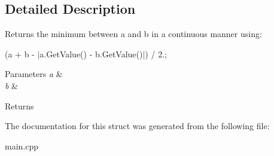 \subsection{Detailed Description}
Returns the minimum between a and b in a continuous manner using\+:

(a + b -\/ $\vert$a.Get\+Value() -\/ b.\+Get\+Value()$\vert$) / 2.;


\begin{DoxyParams}{Parameters}
{\em a} & \\
\hline
{\em b} & \\
\hline
\end{DoxyParams}
\begin{DoxyReturn}{Returns}

\end{DoxyReturn}


The documentation for this struct was generated from the following file\+:\begin{DoxyCompactItemize}
\item 
main.\+cpp\end{DoxyCompactItemize}
